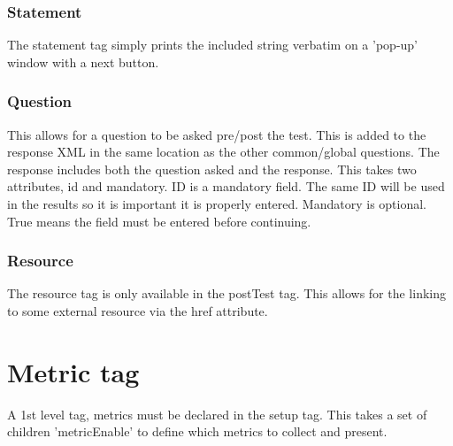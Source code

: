 \documentclass{article}
\begin{document}
\subsubsection{Statement}

The statement tag simply prints the included string verbatim on a 'pop-up' window with a next button.

\subsubsection{Question}

This allows for a question to be asked pre/post the test. This is added to the response XML in the same location as the other common/global questions. The response includes both the question asked and the response. This takes two attributes, id and mandatory. ID is a mandatory field. The same ID will be used in the results so it is important it is properly entered. Mandatory is optional. True means the field must be entered before continuing.

\subsubsection{Resource}

The resource tag is only available in the postTest tag. This allows for the linking to some external resource via the href attribute.

\section{Metric tag}
A 1st level tag, metrics must be declared in the setup tag. This takes a set of children 'metricEnable' to define which metrics to collect and present.
\end{document}
